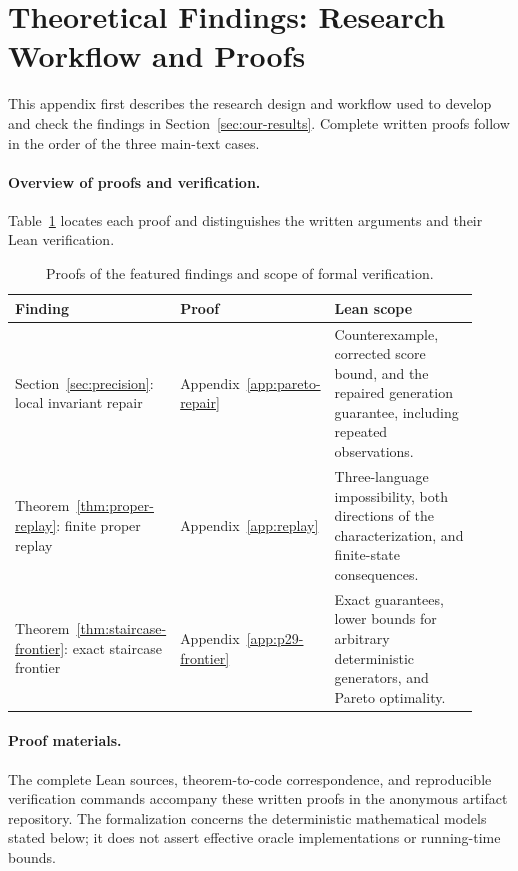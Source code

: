 \section{Theoretical Findings: Research Workflow and Proofs}
\label{app:proof-status}

This appendix first describes the research design and workflow used to
develop and check the findings in Section~\ref{sec:our-results}.
Complete written proofs follow in the order of the three main-text cases.



\paragraph{Overview of proofs and verification.}
Table~\ref{tab:proof-guide} locates each proof and distinguishes the
written arguments and their Lean verification.

\begin{table}[ht]
\centering
\caption{Proofs of the featured findings and scope of formal verification.}
\label{tab:proof-guide}
\small
\begin{tabular}{@{}>{\raggedright\arraybackslash}p{0.30\linewidth}>{\raggedright\arraybackslash}p{0.15\linewidth}>{\raggedright\arraybackslash}p{0.47\linewidth}@{}}
\toprule
Finding & Proof & Lean scope \\
\midrule
Section~\ref{sec:precision}: local invariant repair & Appendix~\ref{app:pareto-repair} & Counterexample, corrected score bound, and the repaired generation guarantee, including repeated observations. \\
Theorem~\ref{thm:proper-replay}: finite proper replay & Appendix~\ref{app:replay} & Three-language impossibility, both directions of the characterization, and finite-state consequences. \\
Theorem~\ref{thm:staircase-frontier}: exact staircase frontier & Appendix~\ref{app:p29-frontier} & Exact guarantees, lower bounds for arbitrary deterministic generators, and Pareto optimality. \\
\bottomrule
\end{tabular}
\end{table}

\paragraph{Proof materials.}
The complete Lean sources, theorem-to-code correspondence, and reproducible
verification commands accompany these written proofs in the
anonymous artifact repository.
The formalization concerns the deterministic mathematical models stated
below; it does not assert effective oracle implementations or running-time
bounds.

